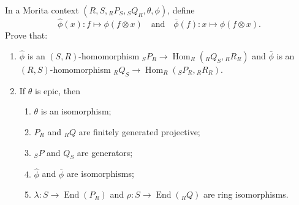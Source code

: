In a Morita context $(R, S, {}_R P_S, {}_S Q_R, \theta, \phi)$, define
$$\hat{\phi}(x): f \mapsto \phi(f \otimes x) \quad \text{and} \quad \bar{\phi}(f): x \mapsto \phi(f \otimes x).$$
Prove that:
\begin{enumerate}
    \item[(1)] $\hat{\phi}$ is an $(S, R)$-homomorphism ${}_S P_R \to \operatorname{Hom}_R({}_R Q_S, {}_R R_R)$ and $\bar{\phi}$ is an $(R, S)$-homomorphism ${}_R Q_S \to \operatorname{Hom}_R({}_S P_R, {}_R R_R)$.
    \item[(2)] If $\theta$ is epic, then
    \begin{enumerate}
        \item[(i)] $\theta$ is an isomorphism;
        \item[(ii)] $P_R$ and ${}_R Q$ are finitely generated projective;
        \item[(iii)] ${}_S P$ and $Q_S$ are generators;
        \item[(iv)] $\hat{\phi}$ and $\bar{\phi}$ are isomorphisms;
        \item[(v)] $\lambda: S \to \operatorname{End}(P_R)$ and $\rho: S \to \operatorname{End}({}_R Q)$ are ring isomorphisms.
    \end{enumerate}
\end{enumerate}

